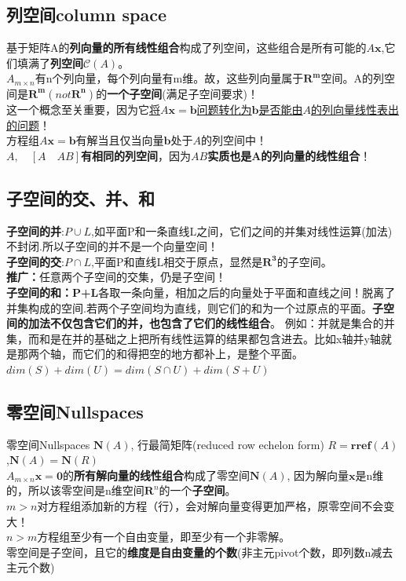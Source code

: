 \documentclass[UTF8]{article}
\begin{document}
    \subsection{列空间column space}
    基于矩阵A的\textbf{列向量的所有线性组合}构成了列空间，这些组合是所有可能的$A\bm{x}$,它们填满了\textbf{列空间}$\bm{\mathcal{C}}(A)$。
    \\
    $A_{m\times n}$有n个列向量，每个列向量有m维。故，这些列向量属于$\bm{R^m}$空间。A的列空间是$\bm{R^m}(not \bm{R^n})$的\textbf{一个子空间}(满足子空间要求)！
    \\
    这一个概念至关重要，因为它\underline{将$A\bm{x}=\bm{b}$问题转化为$\bm{b}$是否能由$A$的列向量线性表出的问题}！
    \\
    方程组$A\bm{x}=\bm{b}$有解当且仅当向量$\bm{b}$处于$A$的列空间中！\\
    $A, \quad [A \quad AB]$\textbf{有相同的列空间}，因为$AB$\textbf{实质也是A的列向量的线性组合}！
    \\
    \subsection{子空间的交、并、和}
    \textbf{子空间的并}:$P\cup L$,如平面P和一条直线L之间，它们之间的并集对线性运算(加法)不封闭.所以子空间的并不是一个向量空间！
    \\
    \textbf{子空间的交}:$P\cap L$,平面P和直线L相交于原点，显然是$\bm{R^3}$的子空间。\\
    \textbf{推广：}任意两个子空间的交集，仍是子空间！\\
    \textbf{子空间的和：P+L}各取一条向量，相加之后的向量处于平面和直线之间！脱离了并集构成的空间.若两个子空间均为直线，则它们的和为一个过原点的平面。\textbf{子空间的加法不仅包含它们的并，也包含了它们的线性组合}。
    例如：并就是集合的并集，而和是在并的基础之上把所有线性运算的结果都包含进去。比如x轴并y轴就是那两个轴，而它们的和得把空的地方都补上，是整个平面。
    \\
    $dim(S)+dim(U) = dim(S\cap U) + dim(S+U)$
    \subsection{零空间Nullspaces}
    零空间Nullspaces $\bm{N}(A)$, 行最简矩阵(reduced row echelon form) $R = \bm{rref}(A)$
    ,$\bm{N}(A)=\bm{N}(R)$
    \\
    $A_{m\times n}\bm{x}=\bm{0}$的\textbf{所有解向量的线性组合}构成了零空间$\bm{N}(A)$, 因为解向量$\bm{x}$是n维的，所以该零空间是n维空间$\bm{R}^n$的一个\textbf{子空间}。
    \\
    $m>n$对方程组添加新的方程（行），会对解向量变得更加严格，原零空间不会变大！\\
    $n>m$方程组至少有一个自由变量，即至少有一个非零解。\\
    零空间是子空间，且它的\textbf{维度是自由变量的个数}(非主元pivot个数，即列数n减去主元个数)
\end{document}
